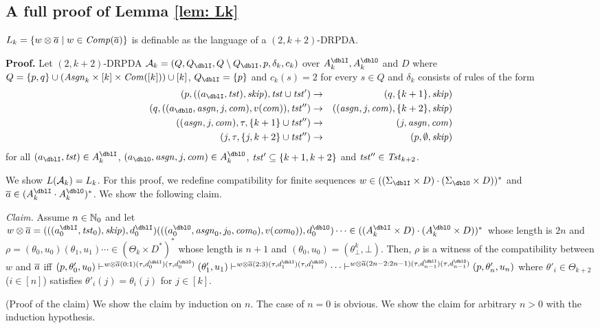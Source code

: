 \subsection{A full proof of Lemma \ref{lem: Lk}}
\setcounter{lemma}{\ref{lem: Lk}}
\addtocounter{lemma}{-1}
\begin{lemma}
$L_k = \{w\otimes{\overline{a}} \mid w\in{\mathit{Comp}}({\overline{a}})\}$ is definable as the language of a $(2,k+2)$-DRPDA.
\end{lemma}
{\bf Proof.}\quad
Let $(2,k+2)$-DRPDA
$\calA_k = (Q, Q_\dblI, Q\setminus Q_\dblI, p, \delta_k, c_k)$ over $A_k^\dblI, A_k^\dblO$ and $D$ where
$Q=\{p, q\}\cup(\mathit{Asgn}_k\times[k]\times\mathit{Com}([k]))\cup[k]$, $Q_\dblI=\{p\}$
and $c_k(s)=2$ for every $s\in Q$ and $\delta_k$ consists of rules of the form
\begin{eqnarray}
(p, ((a_\dblI, \tst), \skip), \tst\cup\tst') &\to& (q, \{k+1\}, \skip)\label{eq: Lk1}\\
(q, ((a_\dblO, \asgn, j, \com), v(\com)), \tst'')&\to& ((\asgn,j,\com), \{k+2\},\skip)\label{eq: Lk2}\\
((\asgn,j,\com), \tau, \{k+1\}\cup\tst'')&\to& (j, \asgn, \com)\label{eq: Lk3}\\
(j, \tau, \{j, k+2\}\cup\tst'')&\to& (p, \emptyset, \skip)\label{eq: Lk4}
\end{eqnarray}
for all $(a_\dblI, \tst)\in A_k^\dblI$, $(a_\dblO, \asgn, j, \com)\in A_k^\dblO$, $\mathit{tst}'\subseteq \{k+1,k+2\}$ and $\mathit{tst}''\in\mathit{Tst}_{k+2}$.

We show $L({\cal A}_k) = L_k$.
For this proof, we redefine compatibility for finite sequences $w\in ((\Sigma_\dblI\times D)\cdot (\Sigma_\dblO\times D))^*$ and $\overa\in(A_k^\dblI\cdot A_k^\dblO)^*$.
We show the following claim.
\par\medskip\noindent
{\it Claim.} Assume $n\in\mathbb{N}_0$ and let $w\otimes\overa = (((a^\dblI_0,\tst_0),\skip), d^\dblI_0)(((a^\dblO_0,\asgn_0,j_0, \com_0), v(\com_0)), d^\dblO_0)\cdots\in ((A_k^\dblI\times D)\cdot(A_k^\dblO\times D))^*$
whose length is $2n$ and
$\rho = (\theta_0,u_0)(\theta_1, u_1)\cdots\in (\Theta_k\times D^*)^*$ whose length is $n+1$ and $(\theta_0, u_0)=(\theta^{k}_\bot, \bot)$.
Then,
$\rho$ is a witness of the compatibility between $w$ and ${\overline{a}}$ iff
$(p,\theta'_0,u_0)\vdash^{w\otimes\overa(0:1)(\tau,d^\dblI_{0})(\tau,d^\dblO_{0})}(\theta'_1,u_1)\vdash^{w\otimes\overa(2:3)(\tau,d^\dblI_{1})(\tau,d^\dblO_{1})}\cdots\vdash^{w\otimes\overa(2n-2:2n-1)(\tau,d^\dblI_{n-1})(\tau,d^\dblO_{n-1})}(p,\theta'_{n},u_{n})$
where $\theta'_i\in \Theta_{k+2}$ ($i\in[n]$) satisfies $\theta'_i(j)=\theta_i(j)$ for $j\in[k]$.
\par\medskip\noindent
(Proof of the claim)
We show the claim by induction on $n$.
The case of $n=0$ is obvious.
We show the claim for arbitrary $n>0$ with the induction hypothesis.

